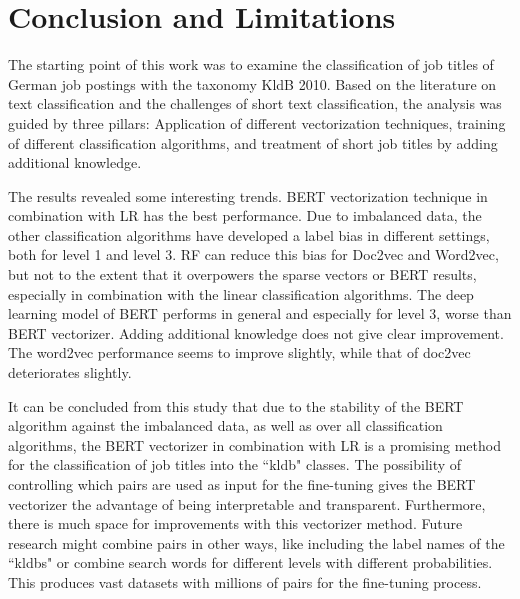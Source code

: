 \documentclass[12pt, a4paper, titlepage]{article}
\begin{document}
\section{Conclusion and Limitations}
The starting point of this work was to examine the classification of job titles of German job postings with the taxonomy \ac{KldB} 2010. Based on the literature on text classification and the challenges of short text classification, the analysis was guided by three pillars: Application of different vectorization techniques, training of different classification algorithms, and treatment of short job titles by adding additional knowledge. 

The results revealed some interesting trends. \ac{BERT} vectorization technique in combination with \ac{LR} has the best performance. Due to imbalanced data, the other classification algorithms have developed a label bias in different settings, both for level 1 and level 3. \ac{RF} can reduce this bias for Doc2vec and Word2vec, but not to the extent that it overpowers the sparse vectors or BERT results, especially in combination with the linear classification algorithms. The deep learning model of \ac{BERT} performs in general and especially for level 3, worse than \ac{BERT} vectorizer. Adding additional knowledge does not give clear improvement. The word2vec performance seems to improve slightly, while that of doc2vec deteriorates slightly. 

It can be concluded from this study that due to the stability of the \ac{BERT} algorithm against the imbalanced data, as well as over all classification algorithms, the BERT vectorizer in combination with LR is a promising method for the classification of job titles into the ``kldb" classes. The possibility of controlling which pairs are used as input for the fine-tuning gives the \ac{BERT} vectorizer the advantage of being interpretable and transparent. Furthermore, there is much space for improvements with this vectorizer method. Future research might combine pairs in other ways, like including the label names of the ``kldbs" or combine search words for different levels with different probabilities. This produces vast datasets with millions of pairs for the fine-tuning process. 
\end{document}
